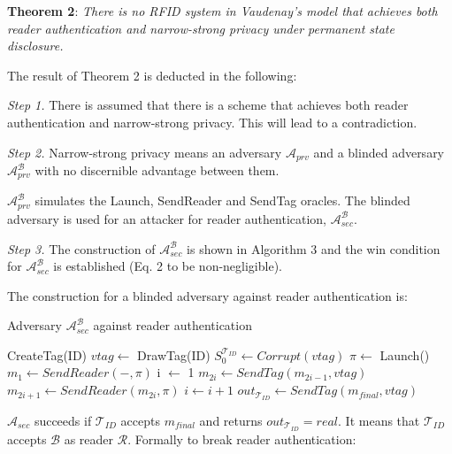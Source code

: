     \textbf{Theorem 2}: \textit{There is no RFID system in Vaudenay's model that achieves both reader authentication and narrow-strong privacy 
    under permanent state disclosure.}

    The result of Theorem 2 is deducted in the following:

    \textit{Step 1.} There is assumed that there is a scheme that achieves both reader authentication and narrow-strong privacy.
    This will lead to a contradiction.

    \textit{Step 2.} Narrow-strong privacy means an adversary $\mathcal{A}_{prv}$ and a blinded adversary $\mathcal{A}_{prv}^{\mathcal{B}}$  with no discernible
    advantage between them.
    
    $\mathcal{A}_{prv}^{\mathcal{B}}$ simulates the Launch, SendReader and SendTag oracles.
    The blinded adversary is used for an attacker for reader authentication, $\mathcal{A}_{sec}^{\mathcal{B}}$.
    
    \textit{Step 3.} The construction of $\mathcal{A}_{sec}^{\mathcal{B}}$ is shown in Algorithm 3 and the win condition for $\mathcal{A}_{sec}^{\mathcal{B}}$
    is established (Eq. 2 to be non-negligible).

    The construction for a blinded adversary against reader authentication is:
    \begin{algorithm}[H] %
        \centering
        \caption{Adversary $\mathcal{A}_{sec}^{\mathcal{B}}$ against reader authentication}
        \begin{algorithmic}[1] %
            \State CreateTag(ID)
            \State $vtag \leftarrow$ DrawTag(ID)
            \State $S_0^{\mathcal{T}_{ID}} \gets Corrupt(vtag)$
            \State $\pi \leftarrow$ Launch() 
            \State $m_1 \leftarrow SendReader(-,\pi)$ 
            \State i $\leftarrow$ 1
                \State $m_{2i} \gets SendTag(m_{2i-1}, vtag)$ 
                \State $m_{2i+1} \gets SendReader(m_{2i}, \pi)$ 
                \State $i \gets i+1$
            \EndWhile
            \State $out_{\mathcal{T}_{ID}} \gets SendTag(m_{final}, vtag)$ 
        \end{algorithmic}
    \end{algorithm}

    $\mathcal{A}_{sec}$ succeeds if $\mathcal{T}_{ID}$ accepts $m_{final}$ and returns $out_{\mathcal{T}_{ID}} = real$.
    It means that $\mathcal{T}_{ID}$ accepts $\mathcal{B}$ as reader $\mathcal{R}$. Formally to break reader authentication:

